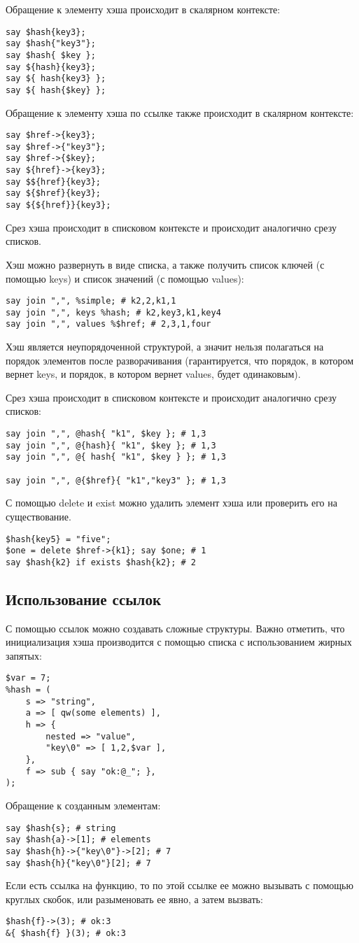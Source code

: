 Обращение к элементу хэша происходит в скалярном контексте:
\begin{verbatim}
say $hash{key3};
say $hash{"key3"};
say $hash{ $key };
say ${hash}{key3};
say ${ hash{key3} };
say ${ hash{$key} };
\end{verbatim}
Обращение к элементу хэша по ссылке также происходит в скалярном контексте:
\begin{verbatim}
say $href->{key3};
say $href->{"key3"};
say $href->{$key};
say ${href}->{key3};
say $${href}{key3};
say ${$href}{key3};
say ${${href}}{key3};
\end{verbatim}
Срез хэша происходит в списковом контексте и происходит аналогично срезу списков.

Хэш можно развернуть в виде списка, а также получить список ключей (с помощью keys) и список значений (с помощью values):
\begin{verbatim}
say join ",", %simple; # k2,2,k1,1
say join ",", keys %hash; # k2,key3,k1,key4
say join ",", values %$href; # 2,3,1,four
\end{verbatim}
Хэш является неупорядоченной структурой, а значит нельзя полагаться на порядок элементов после разворачивания (гарантируется, что порядок, в котором вернет keys, и порядок, в котором вернет values, будет одинаковым).

Срез хэша происходит в списковом контексте и происходит аналогично срезу списков:
\begin{verbatim}
say join ",", @hash{ "k1", $key }; # 1,3
say join ",", @{hash}{ "k1", $key }; # 1,3
say join ",", @{ hash{ "k1", $key } }; # 1,3

say join ",", @{$href}{ "k1","key3" }; # 1,3
\end{verbatim}
С помощью delete и exist можно удалить элемент хэша или проверить его на существование.
\begin{verbatim}
$hash{key5} = "five";
$one = delete $href->{k1}; say $one; # 1
say $hash{k2} if exists $hash{k2}; # 2
\end{verbatim}

\subsection{Использование ссылок} %
С помощью ссылок можно создавать сложные структуры. Важно отметить, что инициализация хэша производится с помощью списка с использованием жирных запятых:
\begin{verbatim}
$var = 7;
%hash = (
    s => "string",
    a => [ qw(some elements) ],
    h => {
        nested => "value",
        "key\0" => [ 1,2,$var ],
    },
    f => sub { say "ok:@_"; },
);
\end{verbatim}
Обращение к созданным элементам:
\begin{verbatim}
say $hash{s}; # string
say $hash{a}->[1]; # elements
say $hash{h}->{"key\0"}->[2]; # 7
say $hash{h}{"key\0"}[2]; # 7
\end{verbatim}
Если есть ссылка на функцию, то по этой ссылке ее можно вызывать с помощью круглых скобок, или разыменовать ее явно, а затем вызвать:
\begin{verbatim}
$hash{f}->(3); # ok:3
&{ $hash{f} }(3); # ok:3
\end{verbatim}

